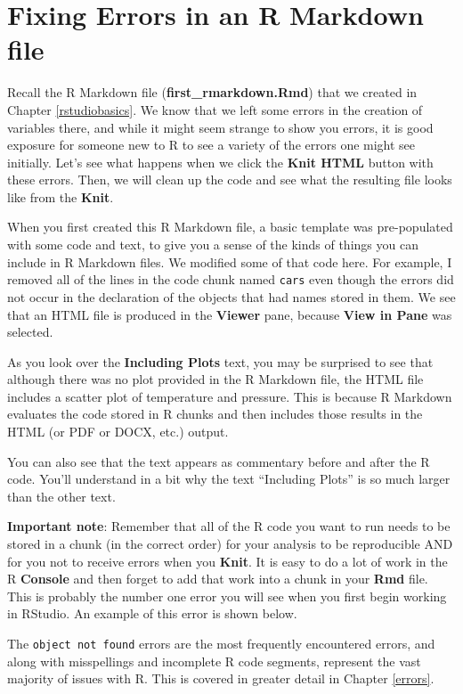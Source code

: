 \documentclass[]{tufte-book}
\begin{document}
\hypertarget{fixerrors}{%
\section{Fixing Errors in an R Markdown file}\label{fixerrors}}

Recall the R Markdown file (\textbf{first\_rmarkdown.Rmd}) that we created in Chapter \ref{rstudiobasics}. We know that we left some errors in the creation of variables there, and while it might seem strange to show you errors, it is good exposure for someone new to R to see a variety of the errors one might see initially. Let's see what happens when we click the \textbf{Knit HTML} button with these errors. Then, we will clean up the code and see what the resulting file looks like from the \textbf{Knit}.

When you first created this R Markdown file, a basic template was pre-populated with some code and text, to give you a sense of the kinds of things you can include in R Markdown files. We modified some of that code here. For example, I removed all of the lines in the code chunk named \texttt{cars} even though the errors did not occur in the declaration of the objects that had names stored in them. We see that an HTML file is produced in the \textbf{Viewer} pane, because \textbf{View in Pane} was selected.

As you look over the \textbf{Including Plots} text, you may be surprised to see that although there was no plot provided in the R Markdown file, the HTML file includes a scatter plot of temperature and pressure. This is because R Markdown evaluates the code stored in R chunks and then includes those results in the HTML (or PDF or DOCX, etc.) output.

You can also see that the text appears as commentary before and after the R code. You'll understand in a bit why the text ``Including Plots'' is so much larger than the other text.

\textbf{Important note}: Remember that all of the R code you want to run needs to be stored in a chunk (in the correct order) for your analysis to be reproducible AND for you not to receive errors when you \textbf{Knit}. It is easy to do a lot of work in the R \textbf{Console} and then forget to add that work into a chunk in your \textbf{Rmd} file. This is probably the number one error you will see when you first begin working in RStudio. An example of this error is shown below.

The \texttt{object\ not\ found} errors are the most frequently encountered errors, and along with misspellings and incomplete R code segments, represent the vast majority of issues with R. This is covered in greater detail in Chapter \ref{errors}.
\end{document}

